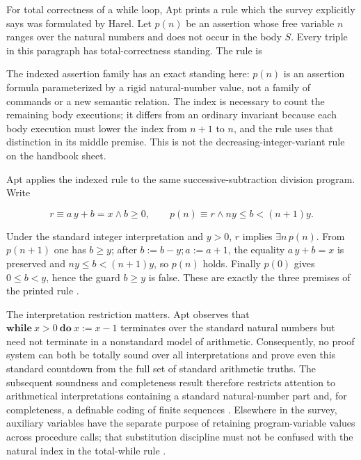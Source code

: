 For total correctness of a while loop, Apt prints a rule which the survey
explicitly says was formulated by Harel.  Let \(p(n)\) be an assertion whose
free variable \(n\) ranges over the natural numbers and does not occur in the
body \(S\).  Every triple in this paragraph has total-correctness standing.
The rule is

\par\noindent
\begin{minipage}{\linewidth}
\end{minipage}
\par

The indexed assertion family has an exact standing here: \(p(n)\) is an
assertion formula parameterized by a rigid natural-number value, not a family
of commands or a new semantic relation.  The index is necessary to count the
remaining body executions; it differs from an ordinary invariant because each
body execution must lower the index from \(n+1\) to \(n\), and the rule uses
that distinction in its middle premise.  This is not the
decreasing-integer-variant rule on the handbook sheet.

Apt applies the indexed rule to the same successive-subtraction division
program.  Write

\[
 r\equiv a\,y+b=x\land b\geq0,
 \qquad
 p(n)\equiv r\land ny\leq b<(n+1)y .
\]

Under the standard integer interpretation and \(y>0\), \(r\) implies
\(\exists n\,p(n)\).  From \(p(n+1)\) one has \(b\geq y\); after
\(b:=b-y;a:=a+1\), the equality \(a\,y+b=x\) is preserved and
\(ny\leq b<(n+1)y\), so \(p(n)\) holds.  Finally \(p(0)\) gives
\(0\leq b<y\), hence the guard \(b\geq y\) is false.  These are exactly the
three premises of the printed rule
\cite[pp.~441--442]{Apt1981}.

The interpretation restriction matters.  Apt observes that
\(\mathbf{while}\ x>0\ \mathbf{do}\ x:=x-1\) terminates over the standard
natural numbers but need not terminate in a nonstandard model of arithmetic.
Consequently, no proof system can both be totally sound over all
interpretations and prove even this standard countdown from the full set of
standard arithmetic truths.  The subsequent soundness and completeness result
therefore restricts attention to arithmetical interpretations containing a
standard natural-number part and, for completeness, a definable coding of
finite sequences \cite[pp.~442--443]{Apt1981}.  Elsewhere in the survey,
auxiliary variables have the separate purpose of retaining program-variable
values across procedure calls; that substitution discipline must not be
confused with the natural index in the total-while rule
\cite[p.~448]{Apt1981}.

